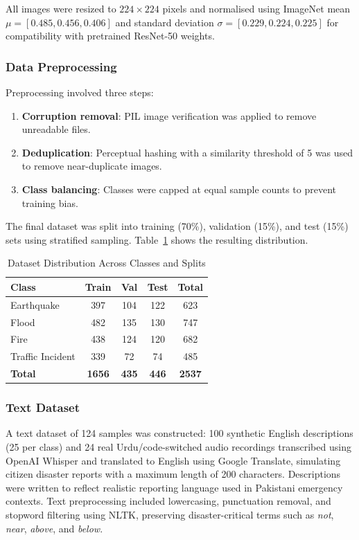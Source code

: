 \documentclass[conference]{IEEEtran}
\begin{document}
All images were resized to $224 \times 224$ pixels and normalised using ImageNet mean $\mu = [0.485, 0.456, 0.406]$ and standard deviation $\sigma = [0.229, 0.224, 0.225]$ for compatibility with pretrained ResNet-50 weights.

\subsubsection{Data Preprocessing}

Preprocessing involved three steps:
\begin{enumerate}
    \item \textbf{Corruption removal}: PIL image verification was applied to remove unreadable files.
    \item \textbf{Deduplication}: Perceptual hashing with a similarity threshold of 5 was used to remove near-duplicate images.
    \item \textbf{Class balancing}: Classes were capped at equal sample counts to prevent training bias.
\end{enumerate}

The final dataset was split into training (70\%), validation (15\%), and test (15\%) sets using stratified sampling. Table~\ref{tab:dataset} shows the resulting distribution.

\begin{table}[h]
\caption{Dataset Distribution Across Classes and Splits}
\label{tab:dataset}
\centering
\begin{tabular}{lcccc}
\toprule
\textbf{Class} & \textbf{Train} & \textbf{Val} & \textbf{Test} & \textbf{Total} \\
\midrule
Earthquake      & 397 & 104 & 122 & 623 \\
Flood           & 482 & 135 & 130 & 747 \\
Fire            & 438 & 124 & 120 & 682 \\
Traffic Incident & 339 & 72  & 74  & 485 \\
\midrule
\textbf{Total}  & \textbf{1656} & \textbf{435} & \textbf{446} & \textbf{2537} \\
\bottomrule
\end{tabular}
\end{table}

\subsubsection{Text Dataset}

A text dataset of 124 samples was constructed: 100 synthetic English descriptions (25 per class) and 24 real Urdu/code-switched audio recordings transcribed using OpenAI Whisper and translated to English using Google Translate, simulating citizen disaster reports with a maximum length of 200 characters. Descriptions were written to reflect realistic reporting language used in Pakistani emergency contexts. Text preprocessing included lowercasing, punctuation removal, and stopword filtering using NLTK, preserving disaster-critical terms such as \textit{not}, \textit{near}, \textit{above}, and \textit{below}.
\end{document}
